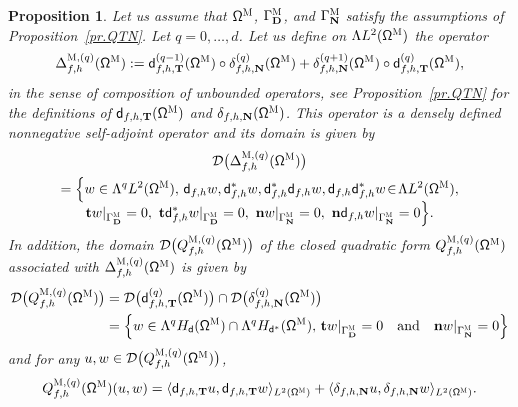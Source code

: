 \documentclass[JEP,XML,SOM,Unicode,NoEqCountersInSection,NoFloatCountersInSection,published]{cedram}
\newcommand{\quand}{\quad\text{and}\quad}
\newcommand{\mbf}[1]{\mathbf{#1}}
\theoremstyle{plain}
\newtheorem{proposition}{Proposition}
\theoremstyle{definition}
\begin{document}
\begin{proposition}
\label{pr.DeltaM}
Let us assume that $\mathsf \Omega^{\textsc{M}}$, $\Gamma^{\textsc{M}}_{\mbf D}$, and $\Gamma^{\textsc{M}}_{\mbf N}$ satisfy the assumptions of Proposition~\ref{pr.QTN}. Let $q=0,\ldots,d$. Let us define on $ \Lambda L^{2} (\mathsf \Omega^{\textsc{M}})$ the operator
\begin{equation}
\label{eq.DeltaTN}
\Delta_{f,h}^{\textsc{M},(q)} (\mathsf \Omega^{\textsc{M}}):= \mathsf d_{f,h,\mbf T}^{(q-1)} (\mathsf \Omega^{\textsc{M}})\circ \delta_{f,h,\mbf N}^{(q)} (\mathsf \Omega^{\textsc{M}})+\delta_{f,h,\mbf N}^{(q+1)} (\mathsf \Omega^{\textsc{M}})\circ \mathsf d_{f,h,\mbf T}^{(q)} (\mathsf \Omega^{\textsc{M}}),
\end{equation}
in the sense of composition of unbounded operators, see Proposition~\ref{pr.QTN} for the definitions of $\mathsf d_{f,h,\mbf T} (\mathsf \Omega^{\textsc{M}})$ and $\delta_{f,h,\mbf N} (\mathsf \Omega^{\textsc{M}})$. This operator is a densely defined nonnegative self-adjoint operator
and its domain is given by
\begin{multline}
\label{eq.domDeltaTN}
\mathcal D\bigl(\Delta_{f,h}^{\textsc{M},(q)} (\mathsf \Omega^{\textsc{M}})\bigr)\\
=\Big\{w \in \Lambda^qL^{2}
(\mathsf \Omega^{\textsc{M}}), \,
\mathsf d_{f,h} w, \mathsf d^*_{f,h}w, \mathsf d^*_{f,h}\mathsf
d_{f,h} w, \mathsf d_{f,h}\mathsf d^*_{f,h} w \!
\in \! \Lambda L^{2} (\mathsf \Omega^{\textsc{M}}), \\[-5pt]
\mathbf{t}w|_{\Gamma^{\textsc{M}}_{\mbf D}}=0,\
\mathbf{t}\mathsf d^*_{f,h}w|_{\Gamma^{\textsc{M}}_{\mbf D}}=0,\
\mathbf{n}w|_{\Gamma^{\textsc{M}}_{\mbf N}}=0,\
\mathbf{n}\mathsf d_{f,h}w|_{\Gamma^{\textsc{M}}_{\mbf N}}=0
\Big\}.
\end{multline}
In addition, the domain $\mathcal D\bigl(Q_{f,h}^{\textsc{M},(q)} (\mathsf \Omega^{\textsc{M}}) \bigr)$ of the closed quadratic form $Q_{f,h}^{\textsc{M},(q)} (\mathsf \Omega^{\textsc{M}})$
associated with $\Delta_{f,h}^{\textsc{M},(q)} (\mathsf \Omega^{\textsc{M}})$
is given by
\begin{align*}
\mathcal D\bigl(Q^{\textsc{M},(q)}_{f,h} (\mathsf \Omega
^{\textsc{M}})\bigr)&= \mathcal D \bigl(\mathsf d_{f,h,\mbf T}^{(q)} (\mathsf \Omega^{\textsc{M}})\bigr)\cap
\mathcal D\bigl(\delta_{f,h,\mbf N}^{(q)} (\mathsf \Omega^{\textsc{M}})\bigr)\\
&=\left\{w\in \Lambda^qH_{\mathsf d}(\mathsf \Omega^{\textsc{M}})\cap \Lambda^qH_{\mathsf d^*}(\mathsf \Omega^{\textsc{M}}),\,
\mathbf t w|_{\Gamma^{\textsc{M}}_{\mbf D}}=0 \quand 
\mathbf n w|_{\Gamma^{\textsc{M}}_{\mbf N}}=0\right\}
\end{align*}
\label{page.qm}
and for any $u,w\in\mathcal D\bigl(Q^{\textsc{M},(q)}_{f,h} (\mathsf \Omega^{\textsc{M}})\bigr)$,
\[
Q_{f,h}^{\textsc{M},(q)} (\mathsf \Omega^{\textsc{M}})(u,w)=\langle \mathsf d_{f,h,\mbf T} u,\mathsf d_{f,h,\mbf T}w \rangle_{L^2(\mathsf \Omega^{\textsc{M}})} +\langle \delta_{f,h,\mbf N}u,\delta_{f,h,\mbf N}w \rangle_{L^2(\mathsf \Omega^{\textsc{M}})}.
\]
\end{proposition}
\end{document}
